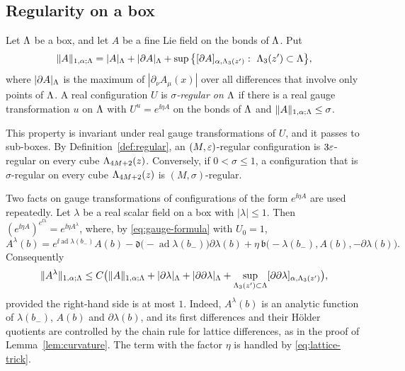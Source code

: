 \subsection{Regularity on a box}

\begin{definition}\label{def:box-regular}
Let $\Lambda$ be a box, and let $A$ be a fine Lie field on the bonds of $\Lambda$. Put
\[
\|A\|_{1,\alpha;\Lam}=|A|_\Lam+|\partial A|_\Lam+\sup\big\{\Hol{\partial A}{\Lam_3(z')}:\ \Lam_3(z')\subset\Lam\big\},
\]
where $|\partial A|_\Lambda$ is the maximum of $|\partial_\nu A_\mu(x)|$ over all differences that involve only points of $\Lambda$. A real configuration $U$ is \emph{$\sigma$-regular on $\Lambda$} if there is a real gauge transformation $u$ on $\Lambda$ with $U^u=e^{\ii\eta A}$ on the bonds of $\Lambda$ and $\|A\|_{1,\alpha;\Lambda}\le\sigma$.
\end{definition}

This property is invariant under real gauge transformations of $U$, and it passes to sub-boxes. By Definition~\ref{def:regular}, an $(M,\varepsilon)$-regular configuration is $3\varepsilon$-regular on every cube $\Lambda_{4M+2}(z)$. Conversely, if $0<\sigma\le1$, a configuration that is $\sigma$-regular on every cube $\Lambda_{4M+2}(z)$ is $(M,\sigma)$-regular.

Two facts on gauge transformations of configurations of the form $e^{\ii\eta A}$ are used repeatedly. Let $\lambda$ be a real scalar field on a box with $|\lambda|\le1$. Then $(e^{\ii\eta A})^{e^{\ii\lambda}}=e^{\ii\eta A^\lambda}$, where, by \eqref{eq:gauge-formula} with $U_0=1$,
\begin{equation}\label{eq:gauge-formula-1}
A^\lambda(b)=e^{\ii\operatorname{ad}\lambda(b_-)}A(b)-\mathfrak d\big(-\operatorname{ad}\lambda(b_-)\big)\partial\lambda(b)+\eta\,\mathfrak b\big(-\lambda(b_-),A(b),-\partial\lambda(b)\big).
\end{equation}
Consequently
\begin{equation}\label{eq:gauge-bound}
\|A^\lambda\|_{1,\alpha;\Lambda}\le C\big(\|A\|_{1,\alpha;\Lambda}+|\partial\lambda|_\Lambda+|\partial\partial\lambda|_\Lambda+\sup_{\Lambda_3(z')\subset\Lambda}[\partial\partial\lambda]_{\alpha,\Lambda_3(z')}\big),
\end{equation}
provided the right-hand side is at most $1$. Indeed, $A^\lambda(b)$ is an analytic function of $\lambda(b_-)$, $A(b)$ and $\partial\lambda(b)$, and its first differences and their H\"older quotients are controlled by the chain rule for lattice differences, as in the proof of Lemma~\ref{lem:curvature}. The term with the factor $\eta$ is handled by \eqref{eq:lattice-trick}.

